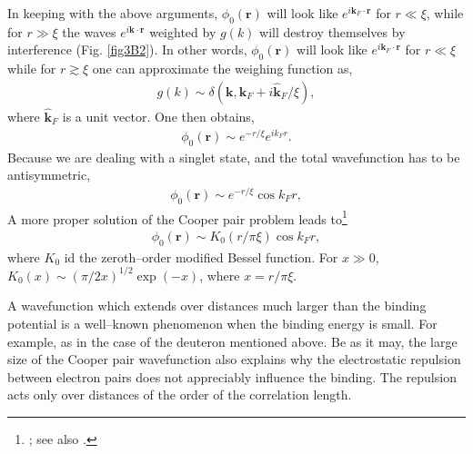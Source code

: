 \begin{subappendices}
In keeping with the above arguments, $\phi_0(\mathbf r)$ will look like $e^{i\mathbf k_F\cdot \mathbf r}$ for $r\ll\xi$, while for $r\gg \xi$ the waves $e^{i\mathbf k\cdot \mathbf r}$
weighted by $g(k)$ will destroy themselves by interference   (Fig. \ref{fig3B2}). In other words, $\phi_0(\mathbf r)$ will look like $e^{i\mathbf k_F\cdot \mathbf r}$ for $r\ll\xi$ while for $r\gtrsim\xi$ one can approximate the weighing function as,
\begin{align}\label{eq3B7}
g(k)\sim\delta(\mathbf k,\mathbf k_F+i\mathbf{\hat k}_F/\xi),
\end{align}
where $\mathbf{\hat k}_F$ is a unit vector. One then obtains,
\begin{align}\label{eq3B8}
\phi_0(\mathbf r)\sim e^{-r/\xi}e^{ik_Fr}.
\end{align}
Because we are dealing with a singlet state, and the total wavefunction has to be antisymmetric,
\begin{align}\label{eq3B9}
\phi_0(\mathbf r)\sim e^{-r/\xi}\cos k_Fr,
\end{align}
 A more proper solution of the Cooper pair problem leads to\footnote{\cite{Kadin:07}; see also \cite{VanWitsen:14}.}
\begin{align}\label{eq3B10}
\phi_0(\mathbf r)\sim K_0(r/\pi\xi)\cos k_Fr,
\end{align}
where $K_0$ id the zeroth--order modified Bessel function. For $x\gg 0$, $K_0(x)\sim (\pi/2x)^{1/2}\exp(-x)$, where $x=r/\pi\xi$.

A wavefunction which extends over distances much larger than the binding potential is a well--known phenomenon when the binding energy is small. For example, as in the case of the deuteron mentioned above.  Be as it may, the large size of the Cooper pair wavefunction also explains why the electrostatic repulsion between electron pairs does not appreciably influence the binding. The repulsion acts only over distances of the order of the correlation length. 


\end{subappendices}
